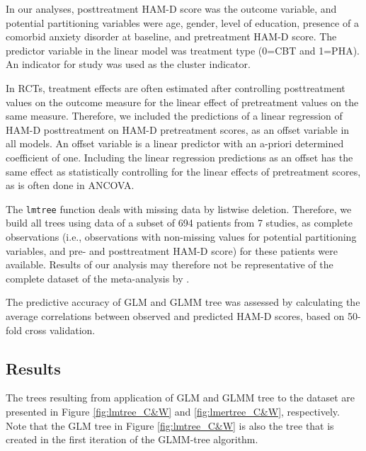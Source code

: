 \documentclass[nobf,doc]{apa}
\begin{document}
In our analyses, posttreatment HAM-D score was the outcome variable, and potential partitioning variables were age, gender, level of education, presence of a comorbid anxiety disorder at baseline, and pretreatment HAM-D score. The predictor variable in the linear model was treatment type (0=CBT and 1=PHA). An indicator for study was used as the cluster indicator. 

In RCTs, treatment effects are often estimated after controlling posttreatment values on the outcome measure for the linear effect of pretreatment values on the same measure. Therefore, we included the predictions of a linear regression of HAM-D posttreatment on HAM-D pretreatment scores, as an offset variable in all models. An offset variable is a linear predictor with an a-priori determined coefficient of one. Including the linear regression predictions as an offset has the same effect as statistically controlling for the linear effects of pretreatment scores, as is often done in ANCOVA. 

The \verb|lmtree| function deals with missing data by listwise deletion. Therefore, we build all trees using data of a subset of 694 patients from 7 studies, as complete observations (i.e., observations with non-missing values for potential partitioning variables, and pre- and posttreatment HAM-D score) for these patients were available. Results of our analysis may therefore not be representative of the complete dataset of the meta-analysis by \cite{CuijyWeit14}. 

The predictive accuracy of GLM and GLMM tree was assessed by calculating the average correlations between observed and predicted HAM-D scores, based on 50-fold cross validation.

\subsection{Results}

The trees resulting from application of GLM and GLMM tree to the dataset are presented in Figure \ref{fig:lmtree_C&W} and \ref{fig:lmertree_C&W}, respectively. Note that the GLM tree in Figure \ref{fig:lmtree_C&W} is also the tree that is created in the first iteration of the GLMM-tree algorithm. 
\end{document}
